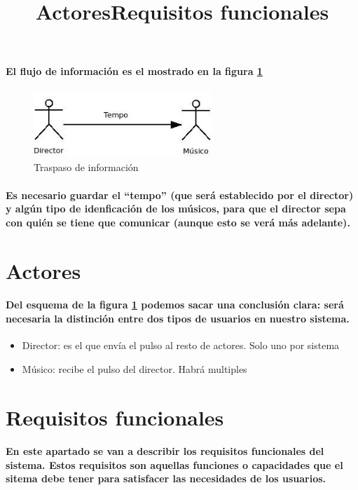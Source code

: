 \paragraph{
El flujo de información es el mostrado en la figura \ref{fig:mensajesconceptual}
}
  \begin{figure}[htb]
  \centering
  \includegraphics[width=0.6\textwidth]{./imagenes/mensajesconceptual}
  \caption{Traspaso de información} \label{fig:mensajesconceptual}
  \end{figure}


\paragraph{
Es necesario guardar el ``tempo'' (que será establecido por el director) y algún tipo
de idenficación de los músicos, para que el director sepa con quién se tiene que
comunicar (aunque esto se verá más adelante).
}

\title{Actores}
\section{Actores}
\label{sec:actoresRequisitos}

\paragraph{
Del esquema de la figura \ref{fig:mensajesconceptual} podemos sacar una conclusión clara:
será necesaria la distinción entre dos tipos de usuarios en nuestro sistema.
}
  \begin{itemize}
    \item Director: es el que envía el pulso al resto de actores. Solo uno por sistema
    \item Músico: recibe el pulso del director. Habrá multiples
  \end{itemize}


\title{Requisitos funcionales}
\section{Requisitos funcionales}

\paragraph{
En este apartado se van a describir los requisitos funcionales del sistema.
Estos requisitos son aquellas funciones o capacidades que el sitema debe
tener para satisfacer las necesidades de los usuarios.
}

